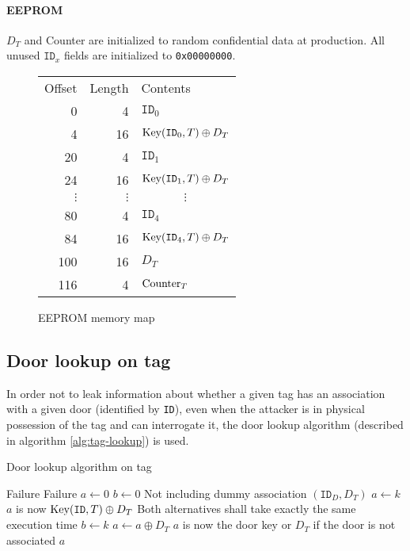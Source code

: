\documentclass[a4paper,10pt]{scrartcl}
\begin{document}
\paragraph{EEPROM} $D_T$ and Counter are initialized to random confidential data at production. All unused $\texttt{ID}_x$ fields are initialized to \verb|0x00000000|.

\begin{figure}[h]
  \centering \caption{EEPROM memory map}
  \begin{tabular}{rr|l|}
    \multicolumn{1}{r}{Offset} & \multicolumn{1}{r}{Length} & \multicolumn{1}{l}{Contents} \\\cline{3-3}
    0 & 4 & $\texttt{ID}_0$ \\\cline{3-3}
    4 & 16 & $\textnormal{Key}(\texttt{ID}_0,T) \oplus D_T$ \\\cline{3-3}
   20 & 4 & $\texttt{ID}_1$ \\\cline{3-3}
   24 & 16 & $\textnormal{Key}(\texttt{ID}_1,T) \oplus D_T$ \\\cline{3-3}
   $\vdots$ & $\vdots$ & \multicolumn{1}{|c|}{$\vdots$} \\\cline{3-3}
   80 & 4 & $\texttt{ID}_4$ \\\cline{3-3}
   84 & 16 & $\textnormal{Key}(\texttt{ID}_4,T) \oplus D_T$ \\\cline{3-3}
  100 & 16 & $D_T$ \\\cline{3-3}
  116 & 4 & $\textnormal{Counter}_T$ \\\cline{3-3}
  \end{tabular}
\end{figure}

\subsection{Door lookup on tag} \label{sec:tag-lookup}
In order not to leak information about whether a given tag has an association with a given door (identified by \texttt{ID}), even when the attacker is in physical possession of the tag and can interrogate it, the door lookup algorithm (described in algorithm \ref{alg:tag-lookup}) is used.
\begin{algorithm}
  \centering \caption{Door lookup algorithm on tag} \label{alg:tag-lookup}
  \begin{algorithmic}
        \State \Return Failure
      \EndIf
        \State \Return Failure
      \EndIf
      \State $a \gets 0$
      \State $b \gets 0$
       \Comment Not including dummy association $(\texttt{ID}_D, D_T)$
          \State $a \gets k$ \Comment $a$ is now $\textnormal{Key}(\texttt{ID},T) \oplus D_T$
        \Else \Comment Both alternatives shall take exactly the same execution time
          \State $b \gets k$
        \EndIf
      \EndFor
      \State $a \gets a \oplus D_T$ \Comment $a$ is now the door key or $D_T$ if the door is not associated
      \State \Return $a$
    \EndFunction
  \end{algorithmic}
\end{algorithm}
\end{document}
